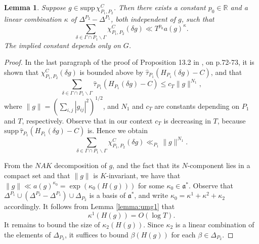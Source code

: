 \documentclass[11pt]{amsart}
\def\R{\mathbb{R}}
\newtheorem{lemma}[theorem]{Lemma}
\numberwithin{theorem}{section}
\numberwithin{equation}{section}
\theoremstyle{remark}
\theoremstyle{definition}
\newcommand{\ga}{\mathfrak{a}}
\begin{document}
\begin{lemma} \label{lemma:umg3}
Suppose $g \in \mathrm{supp}\,\chi_{P_1,P_2}^C$. Then there exists a constant $p_0 \in \R$ and a linear combination $\kappa$ of $\Delta^{P_2} - \Delta^{P_1}$, both independent of $g$, such that
\begin{equation*}
\sum_{\delta \in \Gamma \cap P_1 \backslash \Gamma} \chi_{P_1,P_2}^C(\delta g) \ll T^{p_0} a(g)^\kappa.
\end{equation*}
The implied constant depends only on $G$.
\end{lemma}
\begin{proof}
In the last paragraph of the proof of Proposition 13.2 in \cite{Art05}, on p.72-73, it is shown that $\chi_{P_1,P_2}^C(\delta g)$ is bounded above by $\widehat\tau_{P_1}(H_{P_1}(\delta g)-C)$, and that
\begin{equation*}
\sum_{\delta \in \Gamma \cap P_1 \backslash \Gamma} \widehat\tau_{P_1}(H_{P_1}(\delta g)-C) \leq c_T\|g\|^{N_1},
\end{equation*}
where $\|g\| = \left(\sum_{i,j}|g_{ij}|^2\right)^{1/2}$, and $N_1$ and $c_T$ are constants depending on $P_1$ and $T$, respectively. Observe that in our context $c_T$ is decreasing in $T$, because $\mathrm{supp}\,\widehat\tau_{P_1}(H_{P_1}(\delta g)-C)$ is. Hence we obtain
\begin{equation*}
\sum_{\delta \in \Gamma \cap P_1 \backslash \Gamma} \chi_{P_1,P_2}^C(\delta g) \ll_{P_1} \|g\|^{N_1}.
\end{equation*}

From the $NAK$ decomposition of $g$, and the fact that its $N$-component lies in a compact set and that $\|g\|$ is $K$-invariant, we have that $\|g\| \ll a(g)^{\kappa_0} = \exp(\kappa_0(H(g)))$ for some $\kappa_0 \in \ga^*$. Observe that $\Delta^{P_1} \cup (\Delta^{P_2}-\Delta^{P_1}) \cup \Delta_{P_2}$ is a basis of $\ga^*$, and write $\kappa_0 = \kappa^1 + \kappa^2 + \kappa_2$ accordingly. It follows from Lemma \ref{lemma:umg1} that
\begin{equation}\label{eq:p0_1}
\kappa^1(H(g)) = O(\log T).
\end{equation}
It remains to bound the size of $\kappa_2(H(g))$. Since $\kappa_2$ is a linear combination of the elements of $\Delta_{P_2}$, it suffices to bound $\beta(H(g))$ for each $\beta \in \Delta_{P_2}$.





\end{proof}
\end{document}
